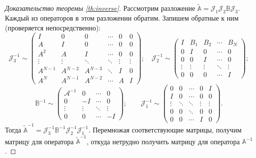 \begin{proof}[Доказательство теоремы \ref{th:inverse}]
    Рассмотрим разложение $\widetilde{\mathbb A} = \mathcal J_1 \mathcal J_2 \mathbb B \mathcal J_3$. Каждый из операторов в этом разложении обратим. Запишем обратные к ним (проверяется непосредственно):
    \[\mathcal J_3^{-1} \sim \begin{pmatrix}
    I & 0 & 0 & \cdots & 0 & 0 \\
    A & I & 0 & \cdots & 0 & 0 \\
    A^2 & A & I & \cdots & 0 & 0 \\
    \vdots & \vdots & \ddots & \ddots & \vdots & \vdots \\
    A^{N-1} & A^{N-2} & A^{N-3} & \ddots & I & 0 \\
    A^N & A^{N-1} & A^{N-2} & \cdots & A & I
   \end{pmatrix}; \quad
   \mathcal J_2^{-1} \sim \begin{pmatrix}
    I & B_1 & B_2 & \cdots & B_N \\
    0 & I & 0 & \cdots &  0 \\
    0 & 0 & I & \cdots &  0 \\
    \vdots & \vdots & \vdots &  \ddots & \vdots \\
    0 & 0 & 0 & \cdots & I
   \end{pmatrix};
   \]
   \[\mathbb B^{-1} \sim \begin{pmatrix}
     \mathcal A^{-1} & 0 & \cdots &  0 \\
    0 & -I  & \cdots &  0 \\
    \vdots & \vdots & \ddots &  \vdots \\
    0 & 0 & \cdots &  -I
   \end{pmatrix}; \quad\quad \mathcal J_1^{-1} \sim \begin{pmatrix}
    0 & 0 & \cdots & 0 &  I \\
    I & 0 & \cdots & 0 &  0 \\[-0.3em]
    \vdots & \ddots & \ddots &  \vdots & \vdots\\[-0.5em]
    0 & 0 & \ddots & 0 & 0 \\
    0 & 0 & \cdots & I & 0
   \end{pmatrix}.\]
   Тогда $\widetilde{\mathbb A}^{-1} = \mathcal J_3^{-1}  \mathbb B^{-1} \mathcal J_2^{-1} \mathcal J_1^{-1}$. Перемножая соответствующие матрицы, получим матрицу для оператора $\widetilde{\mathbb A}^{-1}$, откуда нетрудно получить матрицу для оператора $\mathbb A^{-1}$.
\end{proof}
